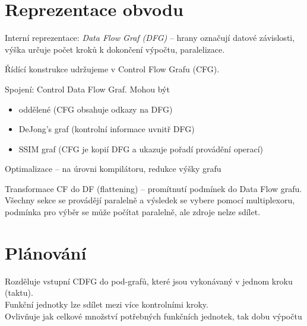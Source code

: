 \documentclass[a4paper, 11pt]{report}
\begin{document}
\section{Reprezentace obvodu}

Interní reprezentace: \emph{Data Flow Graf (DFG)} -- hrany označují datové závislosti, výška určuje počet kroků k dokončení výpočtu, paralelizace.

Řídící konstrukce udržujeme v Control Flow Grafu (CFG).

Spojení: Control Data Flow Graf. Mohou být
\begin{itemize}
	\item oddělené (CFG obsahuje odkazy na DFG)
	\item DeJong's graf (kontrolní informace uvnitř DFG)
	\item SSIM graf (CFG je kopií DFG a ukazuje pořadí provádění operací)
\end{itemize}

Optimalizace -- na úrovni kompilátoru, redukce výšky grafu

Transformace CF do DF (flattening) -- promítnutí podmínek do Data Flow grafu.
Všechny sekce se provádějí paralelně a výsledek se vybere pomocí multiplexoru, podmínka pro výběr se může počítat paralelně, ale zdroje nelze sdílet.

\section{Plánování}

Rozděluje vstupní CDFG do pod-grafů, které jsou vykonávaný v jednom kroku (taktu).\\
Funkční jednotky lze sdílet mezi více kontrolními kroky.\\
Ovlivňuje jak celkové množství potřebných funkčních jednotek, tak dobu výpočtu
\end{document}
